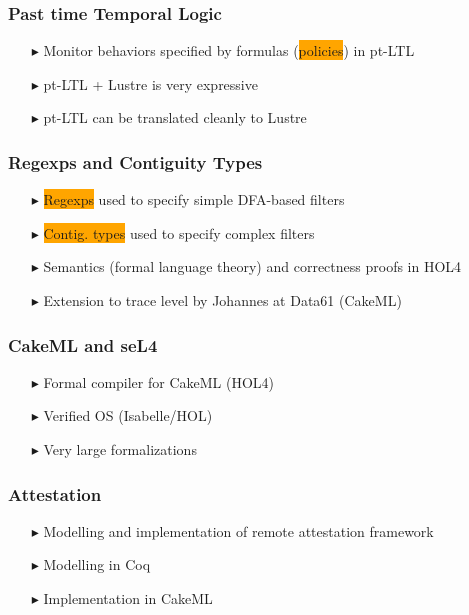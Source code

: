 \documentclass{beamer}
\newcommand{\kemph}[1]{\colorbox{orange}{#1}}
\begin{document}
\begin{frame}\frametitle{Past time Temporal Logic}
\begin{itemize}
\item [$\blacktriangleright$] Monitor behaviors specified by formulas (\kemph{policies}) in pt-LTL
\item [$\blacktriangleright$] pt-LTL + Lustre is very expressive
\item [$\blacktriangleright$] pt-LTL can be translated cleanly to Lustre
\end{itemize}
\end{frame}

\begin{frame}\frametitle{Regexps and Contiguity Types}
\begin{itemize}
\item [$\blacktriangleright$] \kemph{Regexps} used to specify simple DFA-based filters
\item [$\blacktriangleright$] \kemph{Contig. types} used to specify complex filters
\item [$\blacktriangleright$] Semantics (formal language theory) and correctness proofs in HOL4
\item [$\blacktriangleright$] Extension to trace level by Johannes at Data61 (CakeML)
\end{itemize}
\end{frame}

\begin{frame}\frametitle{CakeML and seL4}
\begin{itemize}
\item [$\blacktriangleright$] Formal compiler for CakeML (HOL4)
\item [$\blacktriangleright$] Verified OS (Isabelle/HOL)
\item [$\blacktriangleright$] Very large formalizations
\end{itemize}
\end{frame}

\begin{frame}\frametitle{Attestation}
\begin{itemize}
\item [$\blacktriangleright$] Modelling and implementation of remote attestation framework
\item [$\blacktriangleright$] Modelling in Coq
\item [$\blacktriangleright$] Implementation in CakeML
\end{itemize}
\end{frame}
\end{document}
